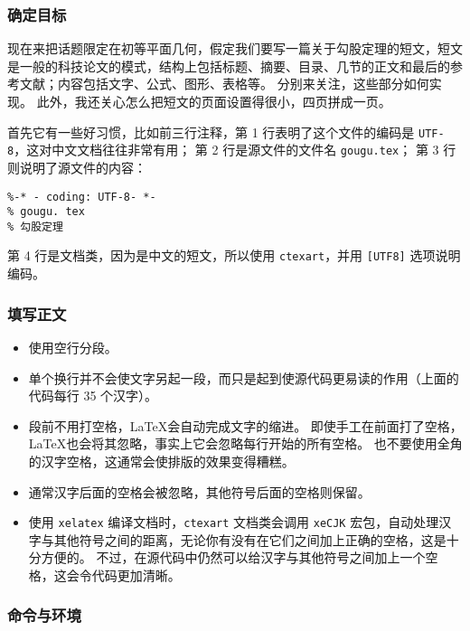 \documentclass[UTF8]{ctexart} %
\begin{document}
\subsubsection{确定目标}
\label{subsub:确定目标}

现在来把话题限定在初等平面几何，假定我们要写一篇关于勾股定理的短文，短文是一般的科技论文的模式，结构上包括标题、摘要、目录、几节的正文和最后的参考文献；内容包括文字、公式、图形、表格等。
分别来关注，这些部分如何实现。
此外，我还关心怎么把短文的页面设置得很小，四页拼成一页。

首先它有一些好习惯，比如前三行注释，第 1 行表明了这个文件的编码是 \verb|UTF-8|，这对中文文档往往非常有用；
第 2 行是源文件的文件名 \verb|gougu.tex|；
第 3 行则说明了源文件的内容：
\begin{verbatim}
%-* - coding: UTF-8- *-
% gougu. tex
% 勾股定理
\end{verbatim}
第 4 行是文档类，因为是中文的短文，所以使用 \verb|ctexart|，并用 \verb|[UTF8]| 选项说明编码。

\subsubsection{填写正文}
\label{subsub:填写正文}

\begin{itemize}
\item
  使用空行分段。
\item
  单个换行并不会使文字另起一段，而只是起到使源代码更易读的作用（上面的代码每行 35 个汉字）。
\item
  段前不用打空格，\LaTeX 会自动完成文字的缩进。
  即使手工在前面打了空格，\LaTeX 也会将其忽略，事实上它会忽略每行开始的所有空格。
  也不要使用全角的汉字空格，这通常会使排版的效果变得糟糕。
\item
  通常汉字后面的空格会被忽略，其他符号后面的空格则保留。
\item
  使用 \verb|xelatex| 编译文档时，\verb|ctexart| 文档类会调用 \verb|xeCJK| 宏包，自动处理汉字与其他符号之间的距离，无论你有没有在它们之间加上正确的空格，这是十分方便的。
  不过，在源代码中仍然可以给汉字与其他符号之间加上一个空格，这会令代码更加清晰。
\end{itemize}

\subsubsection{命令与环境}
\label{subsub:命令与环境}
\end{document}
